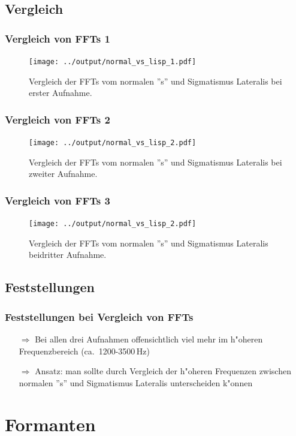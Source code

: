 \documentclass[11pt]{beamer}
\begin{document}
\subsection{Vergleich}

\begin{frame}
\frametitle{Vergleich von FFTs 1}
\begin{figure}
\texttt{[image: ../output/normal\_vs\_lisp\_1.pdf]}
\caption{Vergleich der FFTs vom normalen ''s'' und Sigmatismus Lateralis bei erster Aufnahme.}
\end{figure}
\end{frame}

\begin{frame}
\frametitle{Vergleich von FFTs 2}
\begin{figure}
\texttt{[image: ../output/normal\_vs\_lisp\_2.pdf]}
\caption{Vergleich der FFTs vom normalen ''s'' und Sigmatismus Lateralis bei zweiter Aufnahme.}
\end{figure}
\end{frame}

\begin{frame}
\frametitle{Vergleich von FFTs 3}
\begin{figure}
\texttt{[image: ../output/normal\_vs\_lisp\_2.pdf]}
\caption{Vergleich der FFTs vom normalen ''s'' und Sigmatismus Lateralis beidritter Aufnahme.}
\end{figure}
\end{frame}

\subsection{Feststellungen}

\begin{frame}
\frametitle{Feststellungen bei Vergleich von FFTs}
\begin{itemize}
\item[$\Rightarrow$] Bei allen drei Aufnahmen offensichtlich viel mehr im h"oheren Frequenzbereich (ca.\ 1200-3500\,Hz)
\item[$\Rightarrow$] Ansatz: man sollte durch Vergleich der h"oheren Frequenzen zwischen normalen ''s'' und Sigmatismus Lateralis unterscheiden k"onnen
\end{itemize}
\end{frame}

\section{Formanten}
\end{document}
